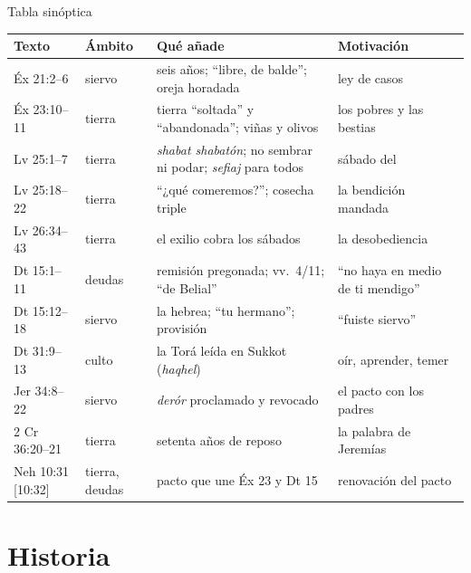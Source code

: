 \begin{frame}{Tabla sinóptica}
\fontsize{6.3}{7.5}\selectfont\renewcommand{\arraystretch}{1.1}
\begin{tabular}{@{}L{1.9cm}L{1.3cm}L{5.6cm}L{3.1cm}@{}}
\toprule
\textbf{Texto} & \textbf{Ámbito} & \textbf{Qué añade} & \textbf{Motivación} \\ \midrule
Éx 21:2--6 & siervo & seis años; ``libre, de balde''; oreja horadada & ley de casos \\
Éx 23:10--11 & tierra & tierra ``soltada'' y ``abandonada''; viñas y olivos & los pobres y las bestias \\
Lv 25:1--7 & tierra & \emph{shabat shabatón}; no sembrar ni podar; \emph{sefiaj} para todos & sábado del \SENOR{} \\
Lv 25:18--22 & tierra & ``¿qué comeremos?''; cosecha triple & la bendición mandada \\
Lv 26:34--43 & tierra & el exilio cobra los sábados & la desobediencia \\
Dt 15:1--11 & deudas & remisión pregonada; vv.~4/11; ``de Belial'' & ``no haya en medio de ti mendigo'' \\
Dt 15:12--18 & siervo & la hebrea; ``tu hermano''; provisión & ``fuiste siervo'' \\
Dt 31:9--13 & culto & la Torá leída en Sukkot (\emph{haqhel}) & oír, aprender, temer \\
Jer 34:8--22 & siervo & \emph{derór} proclamado y revocado & el pacto con los padres \\
2 Cr 36:20--21 & tierra & setenta años de reposo & la palabra de Jeremías \\
Neh 10:31 [10:32] & tierra, deudas & pacto que une Éx 23 y Dt 15 & renovación del pacto \\
\bottomrule
\end{tabular}
\end{frame}

\section{Historia}

